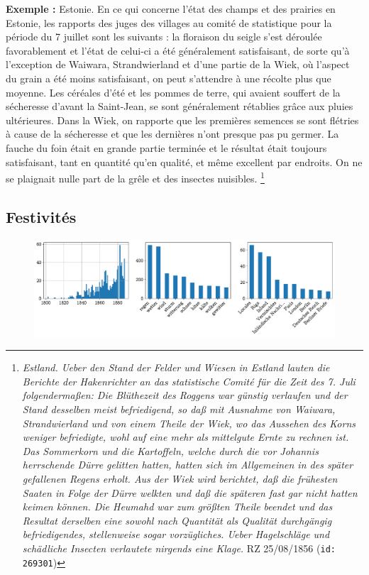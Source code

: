 \documentclass[a4paper,twoside,12pt]{article}
\begin{document}
\noindent \textbf{Exemple :} \og Estonie. En ce qui concerne l'état des champs et des prairies en Estonie, les rapports des juges des villages au comité de statistique pour la période du 7 juillet sont les suivants : la floraison du seigle s'est déroulée favorablement et l'état de celui-ci a été généralement satisfaisant, de sorte qu'à l'exception de Waiwara, Strandwierland et d'une partie de la Wiek, où l'aspect du grain a été moins satisfaisant, on peut s'attendre à une récolte plus que moyenne. Les céréales d'été et les pommes de terre, qui avaient souffert de la sécheresse d'avant la Saint-Jean, se sont généralement rétablies grâce aux pluies ultérieures. Dans la Wiek, on rapporte que les premières semences se sont flétries à cause de la sécheresse et que les dernières n'ont presque pas pu germer. La fauche du foin était en grande partie terminée et le résultat était toujours satisfaisant, tant en quantité qu'en qualité, et même excellent par endroits. On ne se plaignait nulle part de la grêle et des insectes nuisibles. \fg{} \footnote{\textit{Estland. Ueber den Stand der Felder und Wiesen in Estland lauten die Berichte der Hakenrichter an das statistische Comité für die Zeit des 7. Juli folgendermaßen: Die Blüthezeit
des Roggens war günstig verlaufen und der Stand desselben meist befriedigend, so daß mit Ausnahme von Waiwara, Strandwierland und von einem Theile der Wiek, wo das Aussehen des Korns weniger befriedigte, wohl auf eine mehr als mittelgute Ernte zu rechnen ist. Das Sommerkorn und die Kartoffeln, welche durch die vor Johannis
herrschende Dürre gelitten hatten, hatten sich im Allgemeinen in des später gefallenen Regens erholt. Aus der Wiek wird berichtet, daß die frühesten Saaten in Folge der Dürre welkten und daß die späteren fast gar nicht hatten keimen können. Die Heumahd war zum größten Theile
beendet und das Resultat derselben eine sowohl nach Quantität als Qualität durchgängig befriedigendes, stellenweise sogar vorzügliches. Ueber Hagelschläge und schädliche Insecten verlautete nirgends eine Klage.} RZ 25/08/1856 (\texttt{id: 269301})}


\subsection*{Festivités} \label{topic3_festivités}

\begin{figure}[H]
\centering
\includegraphics[width=\textwidth]{images/topic_charts_3.pdf}
\end{figure}
\end{document}
